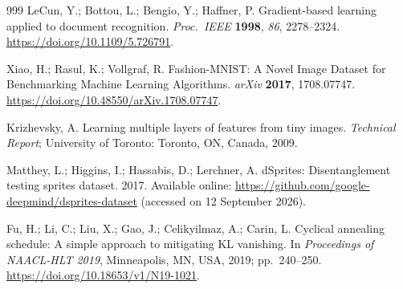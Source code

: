 \documentclass[make,article,submit,pdftex,moreauthors]{Definitions/mdpi}
\begin{document}
\begin{thebibliography}{999}
LeCun, Y.; Bottou, L.; Bengio, Y.; Haffner, P.
Gradient-based learning applied to document recognition.
\textit{Proc.\ IEEE} \textbf{1998}, \textit{86}, 2278--2324.
\url{https://doi.org/10.1109/5.726791}.

Xiao, H.; Rasul, K.; Vollgraf, R.
Fashion-{MNIST}: A Novel Image Dataset for Benchmarking Machine Learning
Algorithms.
\textit{arXiv} \textbf{2017}, 1708.07747. \url{https://doi.org/10.48550/arXiv.1708.07747}.

Krizhevsky, A.
Learning multiple layers of features from tiny images.
\textit{Technical Report}; University of Toronto: Toronto, ON, Canada,
2009.

Matthey, L.; Higgins, I.; Hassabis, D.; Lerchner, A.
dSprites: Disentanglement testing sprites dataset. 2017.
Available online: \url{https://github.com/google-deepmind/dsprites-dataset}
(accessed on 12 September 2026).

Fu, H.; Li, C.; Liu, X.; Gao, J.; Celikyilmaz, A.; Carin, L.
Cyclical annealing schedule: A simple approach to mitigating KL vanishing.
In \textit{Proceedings of NAACL-HLT 2019}, Minneapolis, MN, USA, 2019;
pp.~240--250. \url{https://doi.org/10.18653/v1/N19-1021}.

\end{thebibliography}
\end{document}
